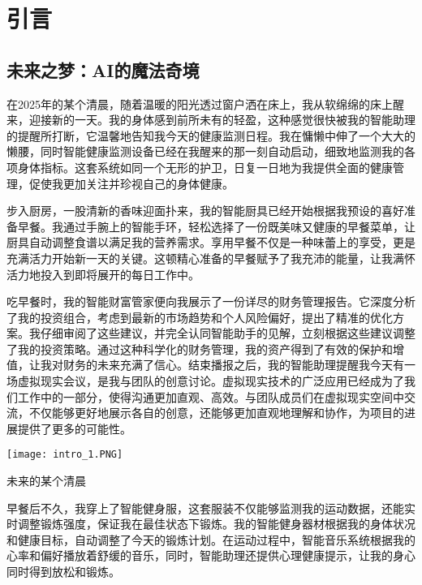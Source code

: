 \setchapterpreamble[u]{\margintoc}
\chapter[引言]{引言\footnotemark[0]}


\section{未来之梦：AI的魔法奇境}

在2025年的某个清晨，随着温暖的阳光透过窗户洒在床上，我从软绵绵的床上醒来，迎接新的一天。我的身体感到前所未有的轻盈，这种感觉很快被我的智能助理的提醒所打断，它温馨地告知我今天的健康监测日程。我在慵懒中伸了一个大大的懒腰，同时智能健康监测设备已经在我醒来的那一刻自动启动，细致地监测我的各项身体指标。这套系统如同一个无形的护卫，日复一日地为我提供全面的健康管理，促使我更加关注并珍视自己的身体健康。

步入厨房，一股清新的香味迎面扑来，我的智能厨具已经开始根据我预设的喜好准备早餐。我通过手腕上的智能手环，轻松选择了一份既美味又健康的早餐菜单，让厨具自动调整食谱以满足我的营养需求。享用早餐不仅是一种味蕾上的享受，更是充满活力开始新一天的关键。这顿精心准备的早餐赋予了我充沛的能量，让我满怀活力地投入到即将展开的每日工作中。

吃早餐时，我的智能财富管家便向我展示了一份详尽的财务管理报告。它深度分析了我的投资组合，考虑到最新的市场趋势和个人风险偏好，提出了精准的优化方案。我仔细审阅了这些建议，并完全认同智能助手的见解，立刻根据这些建议调整了我的投资策略。通过这种科学化的财务管理，我的资产得到了有效的保护和增值，让我对财务的未来充满了信心。结束播报之后，我的智能助理提醒我今天有一场虚拟现实会议，是我与团队的创意讨论。虚拟现实技术的广泛应用已经成为了我们工作中的一部分，使得沟通更加直观、高效。与团队成员们在虚拟现实空间中交流，不仅能够更好地展示各自的创意，还能够更加直观地理解和协作，为项目的进展提供了更多的可能性。

\begin{marginfigure}[-5.5cm]
	\texttt{[image: intro\_1.PNG]}
	\caption[未来的某个清晨]{未来的某个清晨}
	\label{intro_1}
\end{marginfigure}

早餐后不久，我穿上了智能健身服，这套服装不仅能够监测我的运动数据，还能实时调整锻炼强度，保证我在最佳状态下锻炼。我的智能健身器材根据我的身体状况和健康目标，自动调整了今天的锻炼计划。在运动过程中，智能音乐系统根据我的心率和偏好播放着舒缓的音乐，同时，智能助理还提供心理健康提示，让我的身心同时得到放松和锻炼。


